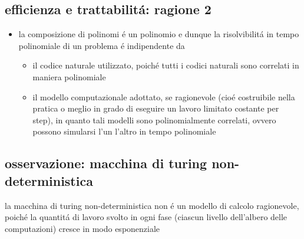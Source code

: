 
\subsection*{\color{cyan} efficienza e trattabilit\'a: ragione 2}
\begin{flushleft}
	\begin{itemize}
		\item la composizione di polinomi \'e un polinomio e dunque la risolvibilit\'a in tempo polinomiale di un problema \'e indipendente da
		\begin{itemize}
			\item il codice naturale utilizzato, poich\'e tutti i codici naturali sono correlati in maniera polinomiale
			\item il modello computazionale adottato, se ragionevole (cio\'e costruibile nella pratica o meglio in grado di eseguire un lavoro limitato costante per step), in quanto tali modelli sono polinomialmente correlati, ovvero possono simularsi l'un l'altro in tempo polinomiale
		\end{itemize}
	\end{itemize}
\end{flushleft}


\subsection*{\color{cyan} osservazione: macchina di turing non-deterministica}
\begin{flushleft}
	la macchina di turing non-deterministica non \'e un modello di calcolo ragionevole, poich\'e la quantit\'a di lavoro svolto in ogni fase (ciascun livello dell'albero delle computazioni) cresce in modo esponenziale
\end{flushleft}


\subsection*{\color{cyan} }
\begin{flushleft}
\end{flushleft}

